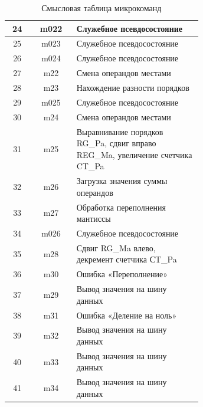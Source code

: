 \documentclass[a4paper,14pt]{extarticle}
\begin{document}
\begin{table}[htbp]
\begin{center}
\begin{tabular}{|c||c|m{0.65\linewidth}|}
			24 & m022 & Служебное псевдосостояние \\ \hline
			25 & m023 & Служебное псевдосостояние \\ \hline
			26 & m024 & Служебное псевдосостояние \\ \hline
			27 & m22 & Смена операндов местами \\ \hline
			28 & m23 & Нахождение разности порядков \\ \hline
			29 & m025 & Служебное псевдосостояние \\ \hline
			30 & m24 & Смена операндов местами \\ \hline
			31 & m25 & Выравнивание порядков RG\_Pa, сдвиг вправо REG\_Ma, увеличение счетчика CT\_Pa \\ \hline
			32 & m26 & Загрузка значения суммы операндов \\ \hline
			33 & m27 & Обработка переполнения мантиссы \\ \hline
			34 & m026 & Служебное псевдосостояние \\ \hline
			35 & m28 & Сдвиг RG\_Ma влево, декремент счетчика СT\_Pa \\ \hline
			36 & m30 & Ошибка «Переполнение» \\ \hline
			37 & m29 & Вывод значения на шину данных \\ \hline
			38 & m31 & Ошибка «Деление на ноль» \\ \hline
			39 & m32 & Вывод значения на шину данных \\ \hline
			40 & m33 & Вывод значения на шину данных \\ \hline
			41 & m34 & Вывод значения на шину данных \\ \hline
		\end{tabular}
	\end{center}
	\caption{Смысловая таблица микрокоманд}
	\label{tab:coursecommands}
\end{table}
\end{document}

